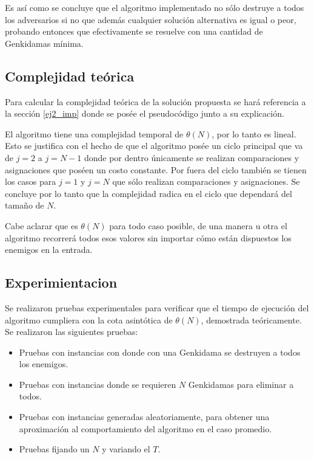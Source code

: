 	Es así como se concluye que el algoritmo implementado no sólo destruye a
	todos los adversarios si no que además cualquier solución alternativa es
	igual o peor, probando entonces que efectivamente se resuelve con una
	cantidad de Genkidamas mínima.

	\subsection{Complejidad teórica}

	Para calcular la complejidad teórica de la solución propuesta se hará
	referencia a la sección \ref{ej2_imp} donde se posée el pseudocódigo junto a
	su explicación.

	El algoritmo tiene una complejidad temporal de $\theta(N)$, por lo tanto es
	lineal. Esto se justifica con el hecho de que el algoritmo posée un ciclo
	principal que va de $j = 2$ a $j = N - 1$ donde por dentro únicamente se
	realizan comparaciones y asignaciones que poséen un costo constante. Por
	fuera del ciclo también se tienen los casos para $j = 1$ y $j = N$ que sólo
	realizan comparaciones y asignaciones. Se concluye por lo tanto que la
	complejidad radica en el ciclo que dependará del tamaño de $N$.

	Cabe aclarar que es $\theta(N)$ para todo caso posible, de una manera u otra
	el algoritmo recorrerá todos esos valores sin importar cómo están dispuestos
	los enemigos en la entrada.


    \subsection{Experimientacion}
         

	Se realizaron pruebas experimentales para verificar que el tiempo de
	ejecución del algoritmo cumpliera con la cota asintótica de $\theta(N)$,
	demostrada teóricamente. Se realizaron las siguientes pruebas:
        
        \begin{itemize}
            \item Pruebas con instancias con donde con una Genkidama se
				destruyen a todos los enemigos.
            \item Pruebas con instancias donde se requieren $N$ Genkidamas para
				eliminar a todos.
            \item Pruebas con instancias generadas aleatoriamente, para obtener una aproximación al comportamiento del algoritmo en el caso promedio.
            \item Pruebas fijando un $N$ y variando el $T$.
        \end{itemize}

